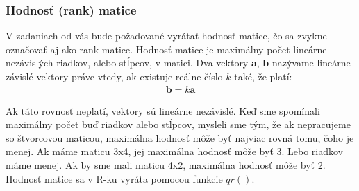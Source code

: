 \hypertarget{hodnosux165-rank-matice}{%
\subsubsection{Hodnosť (rank) matice}\label{hodnosux165-rank-matice}}

V zadaniach od vás bude požadované vyrátať hodnosť matice, čo sa zvykne
označovať aj ako rank matice. Hodnosť matice je maximálny počet lineárne
nezávislých riadkov, alebo stĺpcov, v matici. Dva vektory \textbf{a}, \textbf{b} nazývame
lineárne závislé vektory práve vtedy, ak existuje reálne číslo \(k\)
také, že platí:
\begin{align*}
\textbf{b} = k  \textbf{a}
\end{align*}

Ak táto rovnosť neplatí, vektory sú lineárne nezávislé. Keď sme
spomínali maximálny počet buď riadkov alebo stĺpcov, mysleli sme tým, že
ak nepracujeme so štvorcovou maticou, maximálna hodnosť môže byť najviac
rovná tomu, čoho je menej. Ak máme maticu 3x4, jej maximálna hodnosť
môže byť 3. Lebo riadkov máme menej. Ak by sme mali maticu 4x2,
maximálna hodnosť môže byť 2. Hodnosť matice sa v R-ku vyráta pomocou
funkcie \(qr()\).

\begin{Shaded}
\begin{Highlighting}[]

\StringTok{ }\NormalTok{(}\NormalTok{, }\NormalTok{, }\NormalTok{, }\NormalTok{)}
\StringTok{ }\NormalTok{(}\NormalTok{, }\NormalTok{, }\NormalTok{, }\NormalTok{)}
\StringTok{ }\NormalTok{(}\NormalTok{, }\NormalTok{, }\NormalTok{, }\NormalTok{)}
\StringTok{ }\NormalTok{(}\NormalTok{, }\NormalTok{, }\NormalTok{, }\NormalTok{)}

\StringTok{ }



\OperatorTok{$}
\end{Highlighting}
\end{Shaded}

